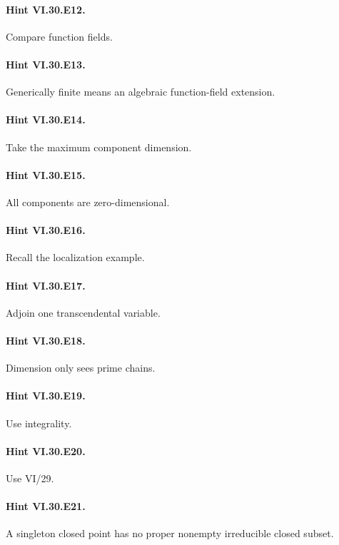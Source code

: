 \paragraph{Hint VI.30.E12.} Compare function fields.

\paragraph{Hint VI.30.E13.} Generically finite means an algebraic function-field extension.

\paragraph{Hint VI.30.E14.} Take the maximum component dimension.

\paragraph{Hint VI.30.E15.} All components are zero-dimensional.

\paragraph{Hint VI.30.E16.} Recall the localization example.

\paragraph{Hint VI.30.E17.} Adjoin one transcendental variable.

\paragraph{Hint VI.30.E18.} Dimension only sees prime chains.

\paragraph{Hint VI.30.E19.} Use integrality.

\paragraph{Hint VI.30.E20.} Use VI/29.

\paragraph{Hint VI.30.E21.} A singleton closed point has no proper nonempty irreducible closed subset.

